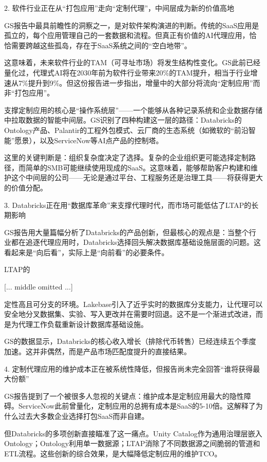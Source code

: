 \documentclass[11pt]{ctexart}
\begin{document}
2. 软件行业正在从“打包应用”走向“定制代理”，中间层成为新的价值高地

GS报告中最具前瞻性的洞察之一，是对软件架构演进的判断。传统的SaaS应用是孤立的，每个应用管理自己的一套数据和流程。但真正有价值的AI代理应用，恰恰需要跨越这些孤岛，存在于SaaS系统之间的“空白地带”。

这意味着，未来软件行业的TAM（可寻址市场）将发生结构性变化。GS此前已经量化过，代理式AI将在2030年前为软件行业带来20\%的TAM提升，相当于行业增速从7\%提升到9\%。但这份报告进一步指出，增量中的大部分将流向“定制应用”而非“打包应用”。

支撑定制应用的核心是“操作系统层”——一个能够从各种记录系统和企业数据存储中拉取数据的智能中间层。GS识别了四种构建这一层的路径：Databricks的Ontology产品、Palantir的工程外包模式、云厂商的生态系统（如微软的“前沿智能”愿景），以及ServiceNow等AI点产品的控制塔。

这里的关键判断是：组织复杂度决定了选择。复杂的企业组织更可能选择定制路径，而简单的SMB可能继续使用现成的SaaS。这意味着，能够帮助客户构建和维护这个中间层的公司——无论是通过平台、工程服务还是治理工具——将获得更大的价值分配。

3. Databricks正在用“数据库革命”来支撑代理时代，而市场可能低估了LTAP的长期影响

GS报告用大量篇幅分析了Databricks的产品创新，但最核心的观点是：当整个行业都在追逐代理应用时，Databricks选择回头解决数据库基础设施层面的问题。这看起来是“向后看”，实际上是“向前看”的必要条件。

LTAP的

[... middle omitted ...]

定性高且可分支的环境。Lakebase引入了近乎实时的数据库分支能力，让代理可以安全地分叉数据集、实验、写入更改并在需要时回退。这不是一个渐进式改进，而是为代理工作负载重新设计数据库基础设施。

GS的数据显示，Databricks的核心收入增长（排除代币转售）已经连续五个季度加速。这并非偶然，而是产品市场匹配度提升的直接结果。

4. 定制代理应用的维护成本正在被系统性降低，但报告尚未完全回答“谁将获得最大份额”

GS报告提到了一个被很多人忽视的关键点：维护成本是定制应用最大的隐性障碍。ServiceNow此前曾量化，定制应用的总拥有成本是SaaS的5-10倍。这解释了为什么过去大多数企业选择打包SaaS而非自建。

但Databricks的多项创新直接瞄准了这一痛点。Unity Catalog作为通用治理层嵌入Ontology；Ontology利用单一数据源；LTAP消除了不同数据源之间脆弱的管道和ETL流程。这些创新的综合效果，是大幅降低定制应用的维护TCO。
\end{document}
